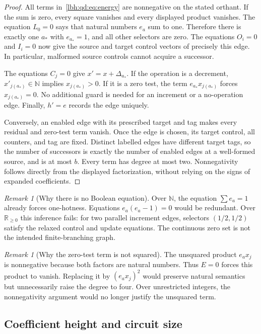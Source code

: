 \documentclass[11pt,letterpaper]{article}
\theoremstyle{definition}
\theoremstyle{remark}
\newtheorem{remark}[theorem]{Remark}
\newcommand{\N}{\mathbb N}
\newcommand{\R}{\mathbb R}
\newcommand{\1}{\mathbf 1}
\begin{document}
\begin{proof}
All terms in~\eqref{lbh:qd:eq:energy} are nonnegative on the stated orthant. If the
sum is zero, every square vanishes and every displayed product vanishes.
The equation $L_0=0$ says that natural numbers $e_a$ sum to one. Therefore
there is exactly one $a_*$ with $e_{a_*}=1$, and all other selectors are zero.
The equations $O_i=0$ and $I_i=0$ now give the source and target control
vectors of precisely this edge. In particular, malformed source controls
cannot acquire a successor.

The equations $C_j=0$ give $x'=x+\Delta_{a_*}$. If the operation is a
decrement, $x'_{j(a_*)}\in\N$ implies $x_{j(a_*)}>0$. If it is a zero test,
the term $e_{a_*}x_{j(a_*)}$ forces $x_{j(a_*)}=0$. No additional guard is
needed for an increment or a no-operation edge. Finally, $h'=e$ records the
edge uniquely.

Conversely, an enabled edge with its prescribed target and tag makes every
residual and zero-test term vanish. Once the edge is chosen, its target
control, all counters, and tag are fixed. Distinct labelled edges have
different target tags, so the number of successors is exactly the number
of enabled edges at a well-formed source, and is at most $b$. Every term has
degree at most two. Nonnegativity follows directly from the displayed
factorization, without relying on the signs of expanded coefficients.
\end{proof}

\begin{remark}[Why there is no Boolean equation]
Over $\N$, the equation $\sum e_a=1$ already forces one-hotness. Equations
$e_a(e_a-1)=0$ would be redundant. Over $\R_{\geq0}$ this inference fails:
for two parallel increment edges, selectors $(1/2,1/2)$ satisfy the relaxed
control and update equations. The continuous zero set is not the intended
finite-branching graph.
\end{remark}

\begin{remark}[Why the zero-test term is not squared]
The unsquared product $e_a x_j$ is nonnegative because both factors are
natural numbers. Thus $E=0$ forces this product to vanish. Replacing it by
$(e_a x_j)^2$ would preserve natural semantics but unnecessarily raise the
degree to four. Over unrestricted integers, the nonnegativity argument would
no longer justify the unsquared term.
\end{remark}

\subsection{Coefficient height and circuit size}
\end{document}
